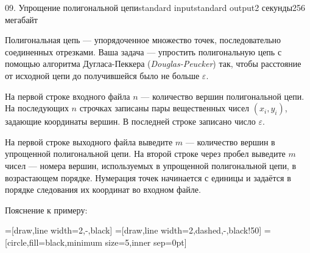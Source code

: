 ﻿\begin{problem}{09. Упрощение полигональной цепи}{standard input}{standard output}{2 секунды}{256 мегабайт}

Полигональная цепь — упорядоченное множество точек, последовательно соединенных отрезками.
Ваша задача — упростить полигональную цепь с помощью алгоритма Дугласа-Пеккера (\emph{Douglas-Peucker}) так,
чтобы расстояние от исходной цепи до получившейся было не больше $\varepsilon$.

\InputFile

На первой строке входного файла $n$ — количество вершин полигональной цепи.
На последующих $n$ строчках записаны пары вещественных чисел $(x_i, y_i)$, задающие координаты вершин.
В последней строке записано число $\varepsilon$.

\OutputFile

На первой строке выходного файла выведите $m$ — количество вершин в упрощенной полигональной цепи.
На второй строке через пробел выведите $m$ чисел — номера вершин, используемых в упрощенной полигональной цепи, в возрастающем порядке.
Нумерация точек начинается с единицы и задаётся в порядке следования их координат во входном файле.

\Examples

\begin{example}%
%
\end{example}
\Note
Пояснение к примеру:
	\begin{center}
	=[draw,line width=2,-,black]
	=[draw,line width=2,dashed,-,black!50]
	=[circle,fill=black,minimum size=5,inner sep=0pt]
	\begin{figure}[htb]
		\begin{minipage}[b]{1.0\linewidth}
\end{minipage}
\end{figure}
\end{center}
\end{problem}
